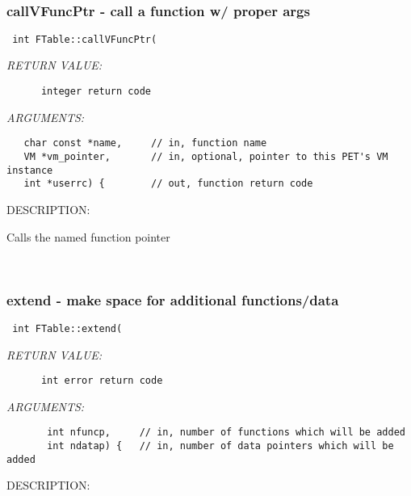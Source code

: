  
\mbox{}\hrulefill\
 
\subsubsection [callVFuncPtr] {callVFuncPtr - call a function w/ proper args}


  
\begin{verbatim} int FTable::callVFuncPtr(\end{verbatim}{\em RETURN VALUE:}
\begin{verbatim}      integer return code\end{verbatim}{\em ARGUMENTS:}
\begin{verbatim}   char const *name,     // in, function name
   VM *vm_pointer,       // in, optional, pointer to this PET's VM instance
   int *userrc) {        // out, function return code\end{verbatim}
{\sf DESCRIPTION:\\ }


      Calls the named function pointer
   
 
\mbox{}\hrulefill\
 
\subsubsection [extend] {extend - make space for additional functions/data}


  
\begin{verbatim} int FTable::extend(\end{verbatim}{\em RETURN VALUE:}
\begin{verbatim}      int error return code\end{verbatim}{\em ARGUMENTS:}
\begin{verbatim}       int nfuncp,     // in, number of functions which will be added
       int ndatap) {   // in, number of data pointers which will be added\end{verbatim}
{\sf DESCRIPTION:\\ }


   
 
